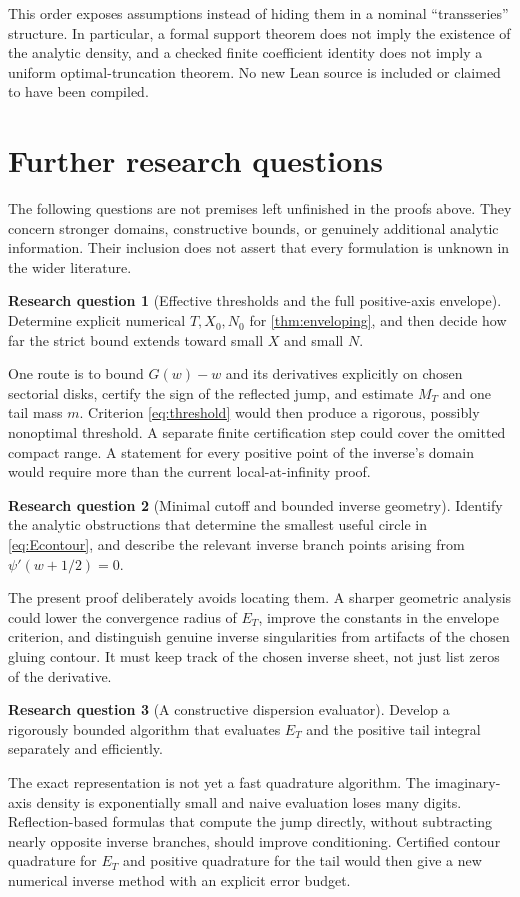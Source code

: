 \documentclass[11pt,a4paper]{article}
\theoremstyle{definition}
\newtheorem{problem}{Research question}
\numberwithin{equation}{section}
\begin{document}
This order exposes assumptions instead of hiding them in a nominal
``transseries'' structure. In particular, a formal support theorem does
not imply the existence of the analytic density, and a checked finite
coefficient identity does not imply a uniform optimal-truncation theorem.
No new Lean source is included or claimed to have been compiled.

\section{Further research questions}
\label{sec:questions}

The following questions are not premises left unfinished in the proofs
above. They concern stronger domains, constructive bounds, or genuinely
additional analytic information. Their inclusion does not assert that
every formulation is unknown in the wider literature.

\begin{problem}[Effective thresholds and the full positive-axis envelope]
Determine explicit numerical $T,X_0,N_0$ for \cref{thm:enveloping}, and
then decide how far the strict bound extends toward small $X$ and small $N$.
\end{problem}
One route is to bound $G(w)-w$ and its derivatives explicitly on chosen
sectorial disks, certify the sign of the reflected jump, and estimate
$M_T$ and one tail mass $m$. Criterion \eqref{eq:threshold} would then
produce a rigorous, possibly nonoptimal threshold. A separate finite
certification step could cover the omitted compact range. A statement
for every positive point of the inverse's domain would require more
than the current local-at-infinity proof.

\begin{problem}[Minimal cutoff and bounded inverse geometry]
Identify the analytic obstructions that determine the smallest useful
circle in \eqref{eq:Econtour}, and describe the relevant inverse branch
points arising from $\psi'(w+1/2)=0$.
\end{problem}
The present proof deliberately avoids locating them. A sharper geometric
analysis could lower the convergence radius of $E_T$, improve the
constants in the envelope criterion, and distinguish genuine inverse
singularities from artifacts of the chosen gluing contour. It must keep
track of the chosen inverse sheet, not just list zeros of the derivative.

\begin{problem}[A constructive dispersion evaluator]
Develop a rigorously bounded algorithm that evaluates $E_T$ and the
positive tail integral separately and efficiently.
\end{problem}
The exact representation is not yet a fast quadrature algorithm.
The imaginary-axis density is exponentially small and naive evaluation
loses many digits. Reflection-based formulas that compute the jump
directly, without subtracting nearly opposite inverse branches, should
improve conditioning. Certified contour quadrature for $E_T$ and
positive quadrature for the tail would then give a new numerical inverse
method with an explicit error budget.
\end{document}
